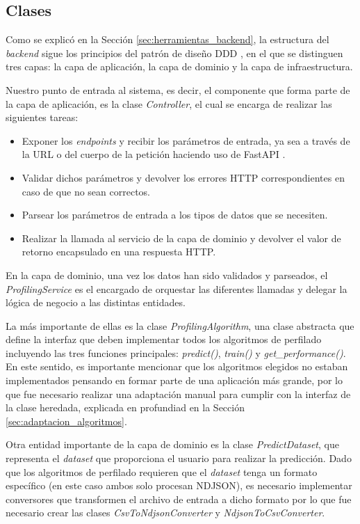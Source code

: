 \subsection{Clases}

\bigskip
Como se explicó en la Sección \ref{sec:herramientas_backend}, la estructura del \textit{backend} sigue los principios
del patrón de diseño DDD \cite{ddd}, en el que se distinguen tres capas: la capa de aplicación, la capa de dominio
y la capa de infraestructura.

\bigskip
Nuestro punto de entrada al sistema, es decir, el componente que forma parte de la capa de aplicación, es la clase
\textit{Controller}, el cual se encarga de realizar las siguientes tareas:

\begin{itemize}
	\item Exponer los \textit{endpoints} y recibir los parámetros de entrada, ya sea a través de la URL o del cuerpo de la petición
	      haciendo uso de FastAPI \cite{fastapi}.
	\item Validar dichos parámetros y devolver los errores HTTP correspondientes en caso de que no sean correctos.
	\item Parsear los parámetros de entrada a los tipos de datos que se necesiten.
	\item Realizar la llamada al servicio de la capa de dominio y devolver el valor de retorno encapsulado en una respuesta HTTP.
\end{itemize}

\bigskip
En la capa de dominio, una vez los datos han sido validados y parseados, el \textit{ProfilingService} es el encargado de orquestar
las diferentes llamadas y delegar la lógica de negocio a las distintas entidades.

\bigskip
La más importante de ellas es la clase \textit{ProfilingAlgorithm},
una clase abstracta que define la interfaz que deben implementar todos los algoritmos de perfilado incluyendo las tres funciones principales:
\textit{predict()}, \textit{train()} y \textit{get\_performance()}. En este sentido, es importante mencionar que los algoritmos elegidos no estaban implementados
pensando en formar parte de una aplicación más grande, por lo que fue necesario realizar una adaptación manual para cumplir con la interfaz de
la clase heredada, explicada en profundiad en la Sección \ref{sec:adaptacion_algoritmos}.

\bigskip
Otra entidad importante de la capa de dominio es la clase \textit{PredictDataset}, que representa el \textit{dataset} que proporciona el usuario
para realizar la predicción. Dado que los algoritmos de perfilado requieren que el \textit{dataset} tenga un formato específico (en este caso
ambos solo procesan NDJSON), es necesario implementar conversores que transformen el archivo de entrada a dicho formato por lo que
fue necesario crear las clases \textit{CsvToNdjsonConverter} y \textit{NdjsonToCsvConverter}.

